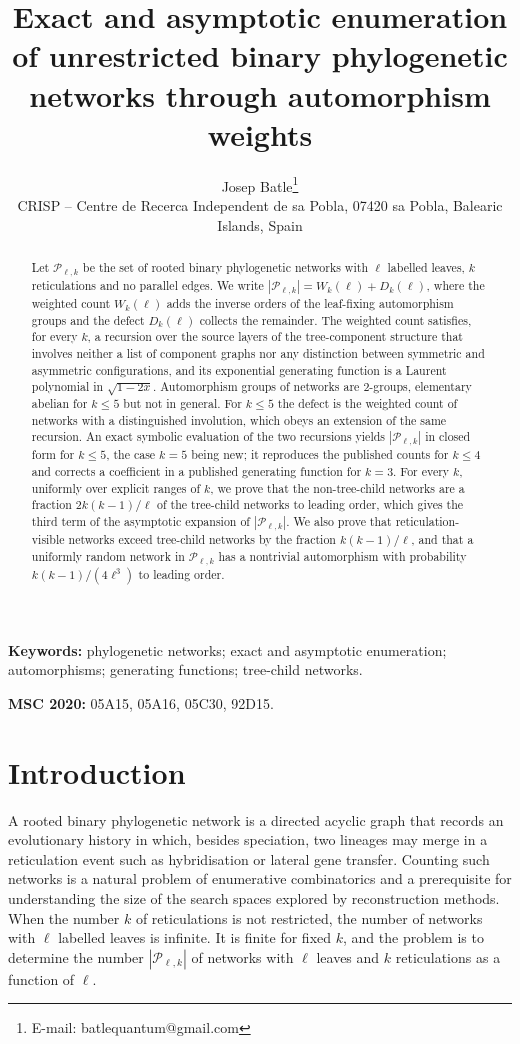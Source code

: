 \documentclass[11pt,a4paper]{article}
\title{Exact and asymptotic enumeration of unrestricted binary phylogenetic networks through automorphism weights}
\author{Josep Batle\thanks{E-mail: batlequantum@gmail.com}\\[4pt]
\small CRISP -- Centre de Recerca Independent de sa Pobla, 07420 sa Pobla, Balearic Islands, Spain}
\date{}
\theoremstyle{definition}
\newcommand{\cP}{\mathcal{P}}
\begin{document}
\maketitle

\begin{abstract}
Let $\cP_{\ell,k}$ be the set of rooted binary phylogenetic networks with $\ell$ labelled leaves, $k$ reticulations and no parallel edges. We write $|\cP_{\ell,k}|=W_k(\ell)+D_k(\ell)$, where the weighted count $W_k(\ell)$ adds the inverse orders of the leaf-fixing automorphism groups and the defect $D_k(\ell)$ collects the remainder. The weighted count satisfies, for every $k$, a recursion over the source layers of the tree-component structure that involves neither a list of component graphs nor any distinction between symmetric and asymmetric configurations, and its exponential generating function is a Laurent polynomial in $\sqrt{1-2x}$. Automorphism groups of networks are $2$-groups, elementary abelian for $k\le5$ but not in general. For $k\le5$ the defect is the weighted count of networks with a distinguished involution, which obeys an extension of the same recursion. An exact symbolic evaluation of the two recursions yields $|\cP_{\ell,k}|$ in closed form for $k\le5$, the case $k=5$ being new; it reproduces the published counts for $k\le4$ and corrects a coefficient in a published generating function for $k=3$. For every $k$, uniformly over explicit ranges of $k$, we prove that the non-tree-child networks are a fraction $2k(k-1)/\ell$ of the tree-child networks to leading order, which gives the third term of the asymptotic expansion of $|\cP_{\ell,k}|$. We also prove that reticulation-visible networks exceed tree-child networks by the fraction $k(k-1)/\ell$, and that a uniformly random network in $\cP_{\ell,k}$ has a nontrivial automorphism with probability $k(k-1)/(4\ell^3)$ to leading order.
\end{abstract}

\noindent\textbf{Keywords:} phylogenetic networks; exact and asymptotic enumeration; automorphisms; generating functions; tree-child networks.

\noindent\textbf{MSC 2020:} 05A15, 05A16, 05C30, 92D15.

\section{Introduction}\label{sec:intro}

A rooted binary phylogenetic network is a directed acyclic graph that records an evolutionary history in which, besides speciation, two lineages may merge in a reticulation event such as hybridisation or lateral gene transfer. Counting such networks is a natural problem of enumerative combinatorics and a prerequisite for understanding the size of the search spaces explored by reconstruction methods. When the number $k$ of reticulations is not restricted, the number of networks with $\ell$ labelled leaves is infinite. It is finite for fixed $k$, and the problem is to determine the number $|\cP_{\ell,k}|$ of networks with $\ell$ leaves and $k$ reticulations as a function of $\ell$.
\end{document}
